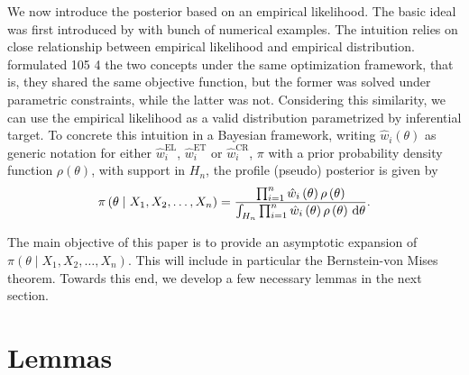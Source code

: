 We now introduce the posterior based on an empirical likelihood. The
basic ideal was first introduced by \citet{lazar2003bayesian} with
bunch of numerical examples. The intuition relies on close relationship
between empirical likelihood and empirical distribution. \citet{owen2010empirical}
formulated 105 4 the two concepts under the same optimization framework,
that is, they shared the same objective function, but the former 
was solved under parametric constraints, while the latter was not.
Considering this similarity, we can use the empirical likelihood as
a valid distribution parametrized by inferential target. To concrete
this intuition in a Bayesian framework, writing $\hat{w}_{i}\left(\theta\right)$
as generic notation for either $\hat{w}_{i}^{\mathrm{EL}}$, $\hat{w}_{i}^{\mathrm{ET}}$
or $\hat{w}_{i}^{\mathrm{CR}}$, $\pi$ with a prior probability density
function $\rho\left(\theta\right)$, with support in $H_{n}$, the
profile (pseudo) posterior is given by 
\begin{equation}
\pi\left(\theta\mid X_{1},X_{2},\ldots,X_{n}\right)=\frac{\prod_{i=1}^{n}\hat{w}_{i}\left(\theta\right)\rho\left(\theta\right)}{\int_{H_{n}}\prod_{i=1}^{n}\hat{w}_{i}\left(\theta\right)\rho\left(\theta\right)\,\mathrm{d}\theta}.\label{eq:poster-el-expression}
\end{equation}


The main objective of this paper is to provide an asymptotic expansion
of $\pi\left(\theta\mid X_{1},X_{2},\ldots,X_{n}\right)$. This will
include in particular the Bernstein-von Mises theorem. Towards this
end, we develop a few necessary lemmas in the next section.


\section{Lemmas}

